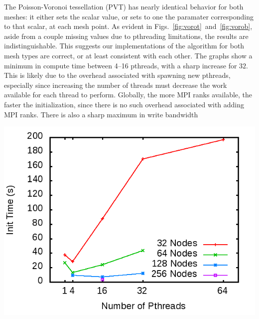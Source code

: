 \documentclass[11pt]{article}
\begin{document}
\begin{multicols*}{2}
The Poisson-Voronoi tessellation (PVT) has nearly identical behavior for both meshes:
it either sets the scalar value, or sets to one the paramater corresponding to that scalar, at each mesh point.
As evident in Figs.~\ref{fig:vorot}~and~\ref{fig:vorob}, aside from a couple missing values due to pthreading limitations, the results are indistinguishable.
This suggests our implementations of the algorithm for both mesh types are correct, or at least consistent with each other.
The graphs show a minimum in compute time between 4--16 pthreads, with a sharp increase for $32$.
This is likely due to the overhead associated with spawning new pthreads, especially since increasing the number of threads must decrease the work available for each thread to perform.
Globally, the more MPI ranks available, the faster the initialization, since there is no such overhead associated with adding MPI ranks.
There is also a sharp maximum in write bandwidth
\begin{center}
\begin{minipage}{0.4\textwidth}\centering
  \includegraphics[width=\textwidth]{img/prMC-init}
  

\end{minipage}
\end{center}
\end{multicols*}
\end{document}
